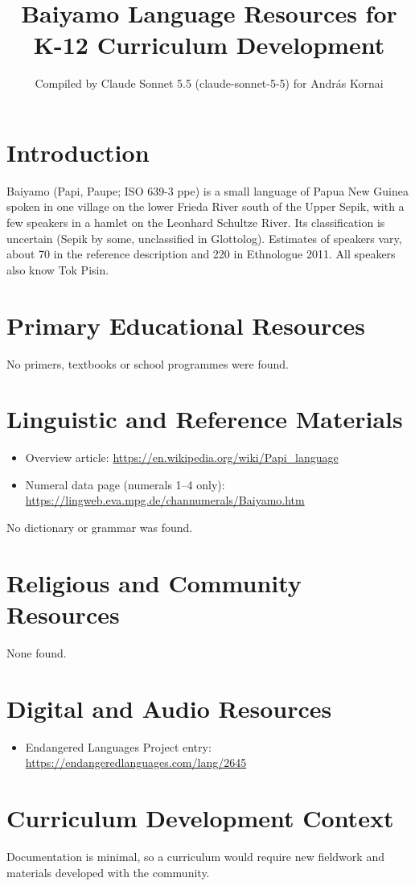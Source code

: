 \documentclass[12pt]{article}
\title{Baiyamo Language Resources for K-12 Curriculum Development}
\author{Compiled by Claude Sonnet 5.5 (claude-sonnet-5-5) for Andr\'as Kornai}
\date{}
\begin{document}
\maketitle

\section{Introduction}
Baiyamo (Papi, Paupe; ISO 639-3 ppe) is a small language of Papua New Guinea spoken in one village on the lower Frieda River south of the Upper Sepik, with a few speakers in a hamlet on the Leonhard Schultze River. Its classification is uncertain (Sepik by some, unclassified in Glottolog). Estimates of speakers vary, about 70 in the reference description and 220 in Ethnologue 2011. All speakers also know Tok Pisin.

\section{Primary Educational Resources}
No primers, textbooks or school programmes were found.

\section{Linguistic and Reference Materials}
\begin{itemize}
\item Overview article: \url{https://en.wikipedia.org/wiki/Papi_language}
\item Numeral data page (numerals 1--4 only): \url{https://lingweb.eva.mpg.de/channumerals/Baiyamo.htm}
\end{itemize}
No dictionary or grammar was found.

\section{Religious and Community Resources}
None found.

\section{Digital and Audio Resources}
\begin{itemize}
\item Endangered Languages Project entry: \url{https://endangeredlanguages.com/lang/2645}
\end{itemize}

\section{Curriculum Development Context}
Documentation is minimal, so a curriculum would require new fieldwork and materials developed with the community.
\end{document}
